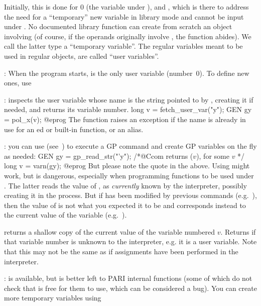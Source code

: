 Initially, this is done for $0$ (the variable  under ), and
, which is there to address the need for a ``temporary'' new
variable in library mode and cannot be input under . No documented
library function can create from scratch an object involving 
(of course, if the operands originally involve , the function
abides). We call the latter type a ``temporary variable''. The regular
variables meant to be used in regular objects, are called ``user
variables''.

: When the program starts,
 is the only user variable (number~$0$). To define new ones, use

: inspects the user variable whose name is
the string pointed to by , creating it if needed, and returns its
variable number.
\bprog
long v = fetch_user_var("y");
GEN gy = pol_x(v);
@eprog\noindent
The function raises an exception if the name is already in use for an
ed or built-in function, or an alias.

: you can use 
(see~) to execute a GP command and create GP
variables on the fly as needed:
\bprog
GEN gy = gp_read_str("'y"); /*@Ccom returns ($v$), for some $v$ */
long v = varn(gy);
@eprog\noindent
But please note the quote  in the above. Using 
might work, but is dangerous, especially when programming functions to
be used under . The latter reads the value of , as
\emph{currently} known by the  interpreter, possibly creating it
in the process. But if  has been modified by previous 
commands (e.g.~), then the value of  is not what you
expected it to be and corresponds instead to the current value of the
 variable (e.g.~).

 returns a shallow copy of the current
value of the variable numbered $v$. Returns  if that variable
number is unknown to the interpreter,  e.g. it is a user variable. Note
that this may not be the same as  if assignments have been
performed in the interpreter.

:
 is available, but is better left to PARI internal functions
(some of which do not check that  is free for them to use,
which can be considered a bug). You can create more temporary variables
using

